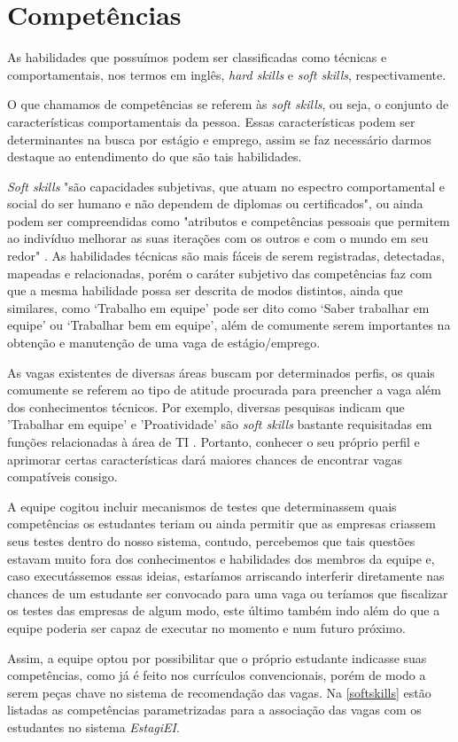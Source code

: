 \section{Competências}

As habilidades que possuímos podem ser classificadas como técnicas e comportamentais, nos termos em inglês, \emph{hard skills} e \emph{soft skills}, respectivamente.

O que chamamos de competências se referem às \emph{soft skills}, ou seja, o conjunto de características comportamentais da pessoa. Essas características podem ser determinantes na busca por estágio e emprego, assim se faz necessário darmos destaque ao entendimento do que são tais habilidades.

\textit{Soft skills} "são capacidades subjetivas, que atuam no espectro comportamental e social do ser humano e não dependem de diplomas ou certificados"\cite{alura_softskills}, ou ainda podem ser compreendidas como "atributos e competências pessoais que permitem ao indivíduo melhorar as suas iterações com os outros e com o mundo em seu redor" \cite{pereira}. As habilidades técnicas são mais fáceis de serem registradas, detectadas, mapeadas e relacionadas, porém o caráter subjetivo das competências faz com que a mesma habilidade possa ser descrita de modos distintos, ainda que similares, como `Trabalho em equipe' pode ser dito como `Saber trabalhar em equipe' ou `Trabalhar bem em equipe', além de comumente serem importantes na obtenção e manutenção de uma vaga de estágio/emprego.

As vagas existentes de diversas áreas buscam por determinados perfis, os quais comumente se referem ao tipo de atitude procurada para preencher a vaga além dos conhecimentos técnicos. Por exemplo, diversas pesquisas indicam que 'Trabalhar em equipe' e 'Proatividade' são \textit{soft skills} bastante requisitadas em funções relacionadas à área de TI \cite{softskillsrequired}. Portanto, conhecer o seu próprio perfil e aprimorar certas características dará maiores chances de encontrar vagas compatíveis consigo.

A equipe cogitou incluir mecanismos de testes que determinassem quais competências os estudantes teriam ou ainda permitir que as empresas criassem seus testes dentro do nosso sistema, contudo, percebemos que tais questões estavam muito fora dos conhecimentos e habilidades dos membros da equipe e, caso executássemos essas ideias, estaríamos arriscando interferir diretamente nas chances de um estudante ser convocado para uma vaga ou teríamos que fiscalizar os testes das empresas de algum modo, este último também indo além do que a equipe poderia ser capaz de executar no momento e num futuro próximo.

Assim, a equipe optou por possibilitar que o próprio estudante indicasse suas competências, como já é feito nos currículos convencionais, porém de modo a serem peças chave no sistema de recomendação das vagas. Na \autoref{softskills} estão listadas as competências parametrizadas para a associação das vagas com os estudantes no sistema \emph{EstagiEI}.